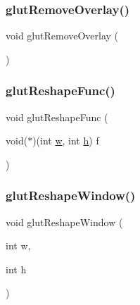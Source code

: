 \subsubsection{\texorpdfstring{glut\+Remove\+Overlay()}{glutRemoveOverlay()}}
{\footnotesize\ttfamily void glut\+Remove\+Overlay (\begin{DoxyParamCaption}{ }\end{DoxyParamCaption})\hspace{0.3cm}{\ttfamily [inline]}}

\mbox{\label{glut_8_h_abc59091e06418d08d8da0be445065d85}} 
\subsubsection{\texorpdfstring{glut\+Reshape\+Func()}{glutReshapeFunc()}}
{\footnotesize\ttfamily void glut\+Reshape\+Func (\begin{DoxyParamCaption}\item[{void($\ast$)(int \hyperlink{forms_8_h_aac374e320caaadeca4874add33b62af2}{w}, int \hyperlink{forms_8_h_a7e427ba5b307f9068129699250690066}{h})}]{f }\end{DoxyParamCaption})\hspace{0.3cm}{\ttfamily [inline]}}

\mbox{\label{glut_8_h_ab84219cb9a443f80ebb949776a3ea57f}} 
\subsubsection{\texorpdfstring{glut\+Reshape\+Window()}{glutReshapeWindow()}}
{\footnotesize\ttfamily void glut\+Reshape\+Window (\begin{DoxyParamCaption}\item[{int}]{w,  }\item[{int}]{h }\end{DoxyParamCaption})\hspace{0.3cm}{\ttfamily [inline]}}

\mbox{\label{glut_8_h_acd0be435d47f8103e62e0e72e878c043}} 
